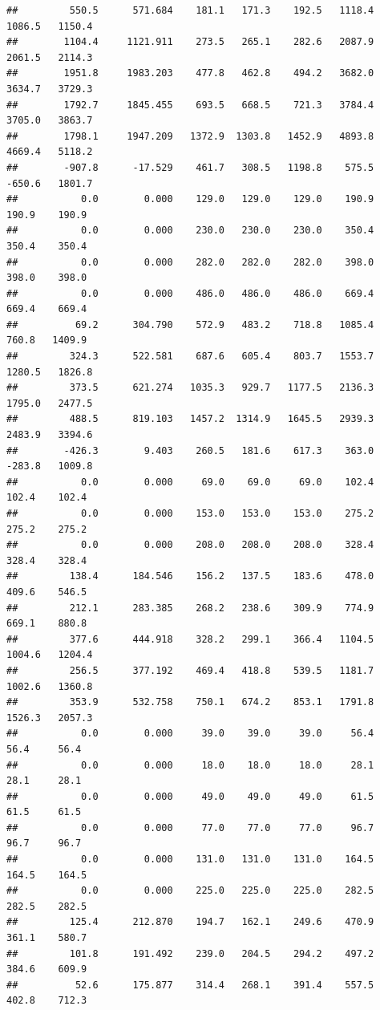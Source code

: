 \documentclass[
]{article}
\begin{document}
\begin{verbatim}
##         550.5      571.684    181.1   171.3    192.5   1118.4   1086.5   1150.4
##        1104.4     1121.911    273.5   265.1    282.6   2087.9   2061.5   2114.3
##        1951.8     1983.203    477.8   462.8    494.2   3682.0   3634.7   3729.3
##        1792.7     1845.455    693.5   668.5    721.3   3784.4   3705.0   3863.7
##        1798.1     1947.209   1372.9  1303.8   1452.9   4893.8   4669.4   5118.2
##        -907.8      -17.529    461.7   308.5   1198.8    575.5   -650.6   1801.7
##           0.0        0.000    129.0   129.0    129.0    190.9    190.9    190.9
##           0.0        0.000    230.0   230.0    230.0    350.4    350.4    350.4
##           0.0        0.000    282.0   282.0    282.0    398.0    398.0    398.0
##           0.0        0.000    486.0   486.0    486.0    669.4    669.4    669.4
##          69.2      304.790    572.9   483.2    718.8   1085.4    760.8   1409.9
##         324.3      522.581    687.6   605.4    803.7   1553.7   1280.5   1826.8
##         373.5      621.274   1035.3   929.7   1177.5   2136.3   1795.0   2477.5
##         488.5      819.103   1457.2  1314.9   1645.5   2939.3   2483.9   3394.6
##        -426.3        9.403    260.5   181.6    617.3    363.0   -283.8   1009.8
##           0.0        0.000     69.0    69.0     69.0    102.4    102.4    102.4
##           0.0        0.000    153.0   153.0    153.0    275.2    275.2    275.2
##           0.0        0.000    208.0   208.0    208.0    328.4    328.4    328.4
##         138.4      184.546    156.2   137.5    183.6    478.0    409.6    546.5
##         212.1      283.385    268.2   238.6    309.9    774.9    669.1    880.8
##         377.6      444.918    328.2   299.1    366.4   1104.5   1004.6   1204.4
##         256.5      377.192    469.4   418.8    539.5   1181.7   1002.6   1360.8
##         353.9      532.758    750.1   674.2    853.1   1791.8   1526.3   2057.3
##           0.0        0.000     39.0    39.0     39.0     56.4     56.4     56.4
##           0.0        0.000     18.0    18.0     18.0     28.1     28.1     28.1
##           0.0        0.000     49.0    49.0     49.0     61.5     61.5     61.5
##           0.0        0.000     77.0    77.0     77.0     96.7     96.7     96.7
##           0.0        0.000    131.0   131.0    131.0    164.5    164.5    164.5
##           0.0        0.000    225.0   225.0    225.0    282.5    282.5    282.5
##         125.4      212.870    194.7   162.1    249.6    470.9    361.1    580.7
##         101.8      191.492    239.0   204.5    294.2    497.2    384.6    609.9
##          52.6      175.877    314.4   268.1    391.4    557.5    402.8    712.3

\end{verbatim}
\end{document}
